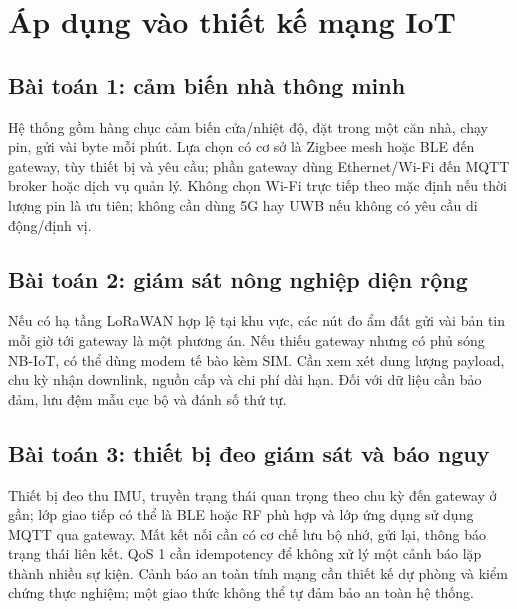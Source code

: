 \section{Áp dụng vào thiết kế mạng IoT}
\subsection{Bài toán 1: cảm biến nhà thông minh}
Hệ thống gồm hàng chục cảm biến cửa/nhiệt độ, đặt trong một căn nhà, chạy pin, gửi vài byte mỗi phút. Lựa chọn có cơ sở là Zigbee mesh hoặc BLE đến gateway, tùy thiết bị và yêu cầu; phần gateway dùng Ethernet/Wi-Fi đến MQTT broker hoặc dịch vụ quản lý. Không chọn Wi-Fi trực tiếp theo mặc định nếu thời lượng pin là ưu tiên; không cần dùng 5G hay UWB nếu không có yêu cầu di động/định vị.
\subsection{Bài toán 2: giám sát nông nghiệp diện rộng}
Nếu có hạ tầng LoRaWAN hợp lệ tại khu vực, các nút đo ẩm đất gửi vài bản tin mỗi giờ tới gateway là một phương án. Nếu thiếu gateway nhưng có phủ sóng NB-IoT, có thể dùng modem tế bào kèm SIM. Cần xem xét dung lượng payload, chu kỳ nhận downlink, nguồn cấp và chi phí dài hạn. Đối với dữ liệu cần bảo đảm, lưu đệm mẫu cục bộ và đánh số thứ tự.
\subsection{Bài toán 3: thiết bị đeo giám sát và báo nguy}
Thiết bị đeo thu IMU, truyền trạng thái quan trọng theo chu kỳ đến gateway ở gần; lớp giao tiếp có thể là BLE hoặc RF phù hợp và lớp ứng dụng sử dụng MQTT qua gateway. Mất kết nối cần có cơ chế lưu bộ nhớ, gửi lại, thông báo trạng thái liên kết. QoS 1 cần idempotency để không xử lý một cảnh báo lặp thành nhiều sự kiện. Cảnh báo an toàn tính mạng cần thiết kế dự phòng và kiểm chứng thực nghiệm; một giao thức không thể tự đảm bảo an toàn hệ thống.
